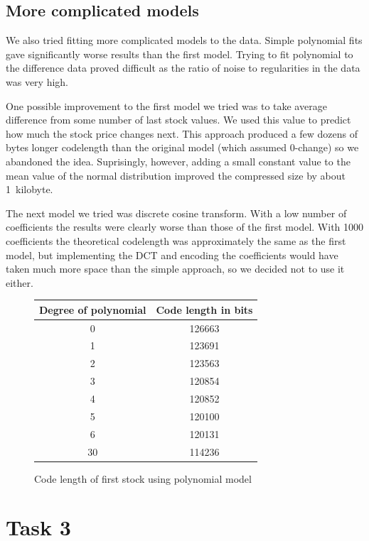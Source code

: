 \documentclass{article}
\begin{document}
\subsection {More complicated models}
We also tried fitting more complicated models to the data.
Simple polynomial fits gave significantly worse results than the first model.
Trying to fit polynomial to the difference data proved difficult as the ratio of noise to regularities in the data was very high.

One possible improvement to the first model we tried was to take average difference
from some number of last stock values. We used this value to predict how much the stock price changes next.
This approach produced a few dozens of bytes longer codelength than the original model (which assumed 0-change) so we
abandoned the idea.
Suprisingly, however, adding a small constant value to the mean value of the normal distribution improved the compressed size by about 1~kilobyte.

The next model we tried was discrete cosine transform.
With a low number of coefficients the results were clearly worse than those of the first model.
With 1000 coefficients the theoretical codelength was approximately the same as the first model, but implementing the DCT and encoding the coefficients would have taken much more space than the simple approach, so we decided not to use it either.

\begin{figure}
\begin{center}
\begin{tabular}{|c|c|}
\hline
    Degree of polynomial & Code length in bits\\ \hline
    0      & 126663 \\  \hline
    1      & 123691 \\ \hline
    2      & 123563 \\ \hline
    3      & 120854 \\ \hline
    4      & 120852 \\ \hline
    5      & 120100 \\ \hline
    6      & 120131 \\ \hline
    30     & 114236 \\ \hline
\end{tabular}
\end{center}
\caption{Code length of first stock using polynomial model}
\label{ex2_polys}
\end{figure}

\section{Task 3}
\end{document}
